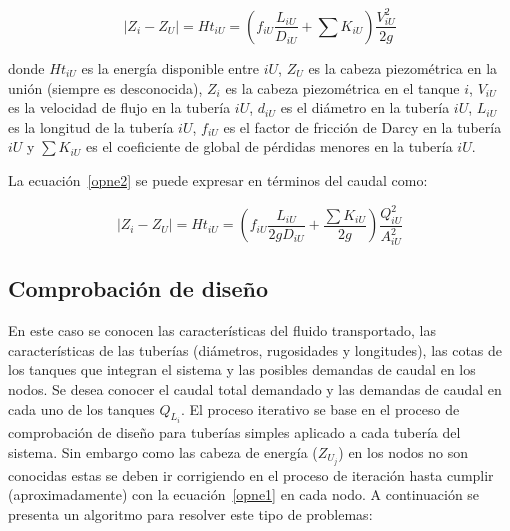 \documentclass[11pt, oneside]{article}
\begin{document}
\begin{equation}
| Z_i - Z_U | =Ht_{iU}= \left( f_{iU} \frac{L_{iU}}{D_{iU}} + \sum K_{iU} \right)\frac{V_{iU}^2}{2g}
\label{opne2}
\end{equation}

donde $Ht_{iU}$ es la energ\'ia disponible entre $iU$, $Z_U$ es la cabeza piezom\'etrica en la uni\'on (siempre es desconocida), $Z_i$ es la cabeza piezom\'etrica en el tanque $i$, $V_{iU}$ es la velocidad de flujo en la tuber\'ia $iU$, $d_{iU}$ es el di\'ametro en la tuber\'ia $iU$, $L_{iU}$ es la longitud de la tuber\'ia $iU$, $f_{iU}$ es el factor de fricci\'on de Darcy en la tuber\'ia $iU$ y $\sum K_{iU}$ es el coeficiente de global de p\'erdidas menores en la tuber\'ia $iU$.

La ecuaci\'on~\ref{opne2} se puede expresar en t\'erminos del caudal como:

\begin{equation}
| Z_i - Z_U | =Ht_{iU}= \left( f_{iU} \frac{L_{iU}}{2gD_{iU}} + \frac{\sum K_{iU}}{2g} \right)\frac{Q_{iU}^2}{A_{iU}^2}
\label{opne3}
\end{equation}


\subsection{Comprobaci\'on de dise\~no} 
En este caso se conocen las caracter\'isticas del fluido transportado, las caracter\'isticas de las tuber\'ias (di\'ametros, rugosidades y longitudes), las cotas de los tanques que integran el sistema y las posibles demandas de caudal en los nodos. Se desea conocer el caudal total demandado y las demandas de caudal en cada uno de los tanques $Q_{L_i}$. El proceso iterativo se base en el proceso de comprobaci\'on de dise\~no para tuber\'ias simples aplicado a cada tuber\'ia del sistema. Sin embargo como las cabeza de energ\'ia ($Z_{U_j}$) en los nodos no son conocidas estas se deben ir corrigiendo en el proceso de iteraci\'on hasta cumplir (aproximadamente) con la ecuaci\'on~\ref{opne1} en cada nodo. A continuaci\'on se presenta un algoritmo para resolver este tipo de problemas:
\end{document}
